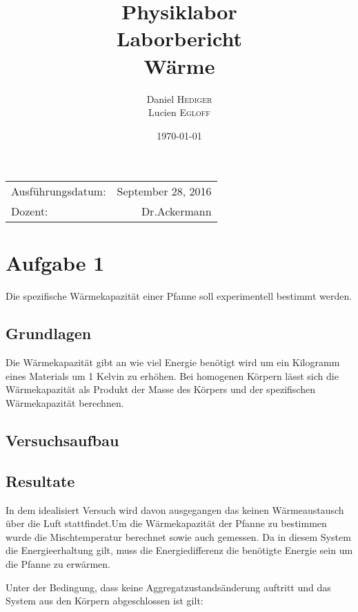 \documentclass{article}
\title{Physiklabor \\ Laborbericht \\ Wärme} %
\author{Daniel \textsc{Hediger} \\ Lucien \textsc{Egloff}} %
\date{\today} %
\begin{document}
\maketitle %

\begin{center}
\begin{tabular}{l r}
Ausführungsdatum: & September 28, 2016 \\ %
Dozent: & Dr.Ackermann %
\end{tabular}
\end{center}
\newpage
\tableofcontents 

\newpage
\section{Aufgabe 1}
Die spezifische Wärmekapazität einer Pfanne soll experimentell bestimmt werden.
\subsection{Grundlagen}
Die Wärmekapazität gibt an wie viel Energie benötigt wird um ein Kilogramm eines Materials um 1 Kelvin zu erhöhen.
Bei homogenen Körpern lässt sich die Wärmekapazität als Produkt der Masse des Körpers und der spezifischen Wärmekapazität berechnen.
\subsection{Versuchsaufbau}
\subsection{Resultate}
In dem idealisiert Versuch wird davon ausgegangen das keinen Wärmeaustausch über die Luft stattfindet.Um die Wärmekapazität der Pfanne zu bestimmen wurde die Mischtemperatur berechnet sowie auch gemessen. Da in diesem System die Energieerhaltung gilt, muss die Energiedifferenz die benötigte Energie sein um die Pfanne zu erwärmen.

Unter der Bedingung, dass keine Aggregatzustandsänderung auftritt und das System aus den Körpern abgeschlossen ist gilt:
\end{document}
